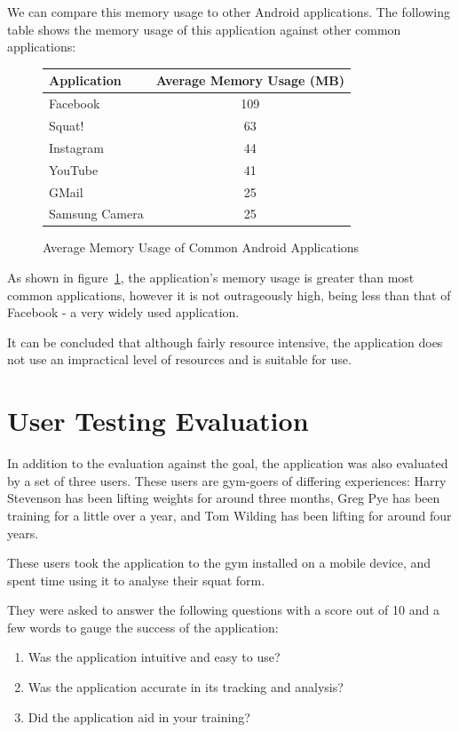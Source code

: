 We can compare this memory usage to other Android applications. The following table shows the memory usage of this application against other common applications:

\begin{figure}[H]
    \centering
	\begin{tabular}{ | l | c | }
	    \hline
	    \textbf{Application} & \textbf{Average Memory Usage (MB)} \\ \hline
	    Facebook & 109 \\ \hline
	    Squat! & 63 \\ \hline
	    Instagram & 44 \\ \hline
	    YouTube & 41 \\ \hline
	    GMail & 25 \\ \hline
	    Samsung Camera & 25 \\
	    \hline
    \end{tabular}
\caption{Average Memory Usage of Common Android Applications}
\label{fig:memusage}
\end{figure}

As shown in figure~\ref{fig:memusage}, the application's memory usage is greater than most common applications, however it is not outrageously high, being less than that of Facebook - a very widely used application.

It can be concluded that although fairly resource intensive, the application does not use an impractical level of resources and is suitable for use.

\section{User Testing Evaluation}
\label{sec:user_testing}
In addition to the evaluation against the goal, the application was also evaluated by a set of three users. These users are gym-goers of differing experiences: Harry Stevenson has been lifting weights for around three months, Greg Pye has been training for a little over a year, and Tom Wilding has been lifting for around four years.

These users took the application to the gym installed on a mobile device, and spent time using it to analyse their squat form.

They were asked to answer the following questions with a score out of 10 and a few words to gauge the success of the application:

\begin{enumerate}
    \item Was the application intuitive and easy to use?
    \item Was the application accurate in its tracking and analysis?
    \item Did the application aid in your training?
\end{enumerate}


